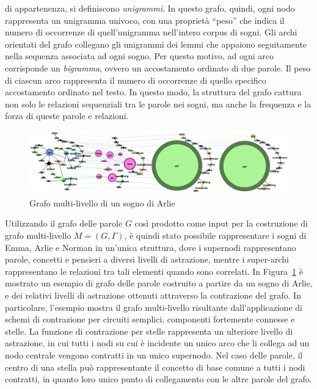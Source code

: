 \begin{enumerate}
          di appartenenza, si definiscono \textit{unigrammi}. In questo grafo, quindi, ogni nodo rappresenta
          un unigramma univoco, con una proprietà ``peso'' che indica il numero di occorrenze di quell'unigramma
          nell'intero corpus di sogni.
          Gli archi orientati del grafo collegano gli unigrammi dei lemmi che appaiono seguitamente nella
          sequenza associata ad ogni sogno.
          Per questo motivo, ad ogni arco corrisponde un \textit{bigramma}, ovvero un accostamento ordinato di due parole.
          Il peso di ciascun arco rappresenta il numero di occorrenze di quello specifico accostamento ordinato nel testo.
          In questo modo, la struttura del grafo cattura non solo le relazioni sequenziali tra le parole nei sogni,
          ma anche la frequenza e la forza di queste parole e relazioni.
\end{enumerate}

\begin{figure}[h!]
    \centering
    \includegraphics[width=1\textwidth]{Immagini/arlie_dream_graph_example}
    \caption{Grafo multi-livello di un sogno di Arlie}
    \label{fig:arlie-dream-graph}
\end{figure}

Utilizzando il grafo delle parole $G$ così prodotto come input per la costruzione di grafo multi-livello
$M = (G, \Gamma)$, è quindi stato possibile rappresentare i sogni di Emma, Arlie e Norman in un'unica struttura,
dove i supernodi rappresentano parole, concetti e pensieri a diversi livelli di astrazione, mentre i super-archi
rappresentano le relazioni tra tali elementi quando sono correlati.
In Figura~\ref{fig:arlie-dream-graph} è mostrato un esempio di grafo delle parole costruito a partire da un sogno di Arlie, e dei
relativi livelli di astrazione ottenuti attraverso la contrazione del grafo.
In particolare, l'esempio mostra il grafo multi-livello risultante dall'applicazione di schemi di contrazione per
circuiti semplici, componenti fortemente connesse e stelle.
La funzione di contrazione per stelle rappresenta un ulteriore livello di astrazione, in cui tutti i nodi su cui è
incidente un unico arco che li collega ad un nodo centrale vengono contratti in un unico supernodo.
Nel caso delle parole, il centro di una stella può rappresentante il concetto di base comune a tutti i nodi contratti,
in quanto loro unico punto di collegamento con le altre parole del grafo.

